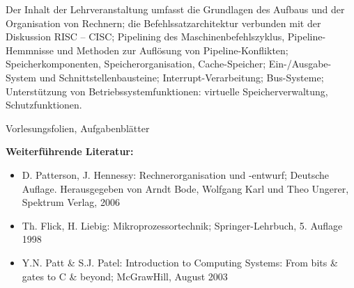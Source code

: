 \begin{course}
\begin{content}
Der Inhalt der Lehrveranstaltung umfasst die Grundlagen des Aufbaus und der Organisation von Rechnern; die Befehlssatzarchitektur verbunden mit der Diskussion RISC – CISC; Pipelining des Maschinenbefehlszyklus, Pipeline-Hemmnisse und Methoden zur Auflösung von Pipeline-Konflikten; Speicherkomponenten, Speicherorganisation, Cache-Speicher; Ein-/Ausgabe-System und Schnittstellenbausteine; Interrupt-Verarbeitung; Bus-Systeme; Unterstützung von Betriebssystemfunktionen: virtuelle Speicherverwaltung, Schutzfunktionen.


\end{content}

\begin{media}Vorlesungsfolien, Aufgabenblätter

\end{media}

\begin{literature}\textbf{Weiterführende Literatur:}

 \begin{itemize}\item D. Patterson, J. Hennessy: Rechnerorganisation und -entwurf; Deutsche Auflage. Herausgegeben von Arndt Bode, Wolfgang Karl und Theo Ungerer, Spektrum Verlag, 2006  \item Th. Flick, H. Liebig: Mikroprozessortechnik; Springer-Lehrbuch, 5. Auflage 1998  \item Y.N. Patt \& S.J. Patel: Introduction to Computing Systems: From bits \& gates to C \& beyond; McGrawHill, August 2003  \end{itemize}\end{literature}



\end{course}